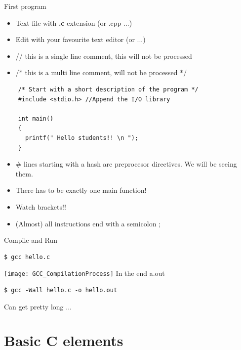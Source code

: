 \documentclass[10pt]{beamer}
\begin{document}
\begin{frame}[fragile]{First program}
      \begin{itemize}
        \item Text file with {\bf .c} extension (or .cpp ...)
        \item Edit with your favourite text editor (or ...)
        \item // this is a single line comment, this will not be processed
        \item /* this is a multi line comment, will not be processed */
      \end{itemize}

    \begin{lstlisting}
    /* Start with a short description of the program */
    #include <stdio.h> //Append the I/O library
   
    int main()
    {
      printf(" Hello students!! \n ");
    }
    \end{lstlisting}  
   
    \begin{itemize}
      \item \# lines starting with a hash are preprocesor directives. We will be seeing them.
      \item There has to be exactly one main function!
      \item Watch brackets!!
      \item (Almost) all instructions end with a semicolon ;
    \end{itemize}
   
\end{frame}

\begin{frame}[fragile]{Compile and Run}
\begin{lstlisting}[style=consol, numbers=none]
$ gcc hello.c
\end{lstlisting}
\centering
\texttt{[image: GCC\_CompilationProcess]}
\newline In the end a.out
\vspace{0.2cm}

\begin{lstlisting}[style=consol, numbers=none]
$ gcc -Wall hello.c -o hello.out
\end{lstlisting}
Can get pretty long ...
\end{frame}

\section{Basic C elements}
\end{document}
